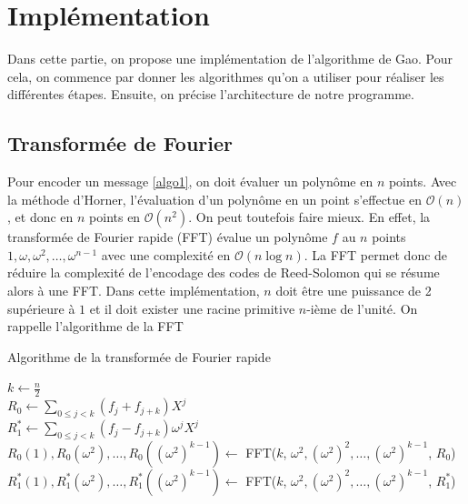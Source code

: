 \documentclass{article}
\theoremstyle{definition}
\theoremstyle{remark}
\begin{document}
\section{Implémentation}
\label{sec:impl}

Dans cette partie, on propose une implémentation de l'algorithme de Gao. Pour cela, on commence par donner les algorithmes qu'on a utiliser pour réaliser les différentes étapes. Ensuite, on précise l'architecture de notre programme.

\subsection{Transformée de Fourier}

Pour encoder un message \ref{algo1}, on doit évaluer un polynôme en $n$ points. Avec la méthode d'Horner, l'évaluation d'un polynôme en un point s'effectue en $\mathcal{O}(n)$, et donc en $n$ points en $\mathcal{O}(n^2)$. On peut toutefois faire mieux. En effet, la transformée de Fourier rapide (FFT) évalue un polynôme $f$ au $n$ points $1, \omega, \omega^2, \dots, \omega^{n-1}$ avec une complexité en $\mathcal{O}(n\log{}n)$.  La FFT permet donc de réduire la complexité de l'encodage des codes de Reed-Solomon qui se résume alors à une FFT. Dans cette implémentation, $n$ doit être une puissance de 2 supérieure à $1$ et il doit exister une racine primitive $n$-ième de l'unité. On rappelle l'algorithme de la FFT

\vspace{0.5cm}

\begin{algorithm}[H]
\label{algo_fft}
\caption{Algorithme de la transformée de Fourier rapide \cite{moderncomp}}
{
} 
$k \gets \frac{n}{2}$ \\
$R_0 \gets \sum_{0 \le j < k} (f_j + f_{j+k})X^j$ \\
$R_1^* \gets \sum_{0 \le j < k} (f_j - f_{j+k})\omega^jX^j $ \\
$ R_0(1), R_0(\omega^2), \dots, R_0((\omega^2)^{k-1}) \gets$ FFT($k$, $\omega^2, (\omega^2)^2, \dots, (\omega^2)^{k-1}$, $R_0$)\\
$R_1^*(1), R_1^*(\omega^2), \dots, R_1^*((\omega^2)^{k-1}) \gets$ FFT($k$, $\omega^2, (\omega^2)^2, \dots, (\omega^2)^{k-1}$, $R_1^*$) \\
\end{algorithm}
\end{document}
